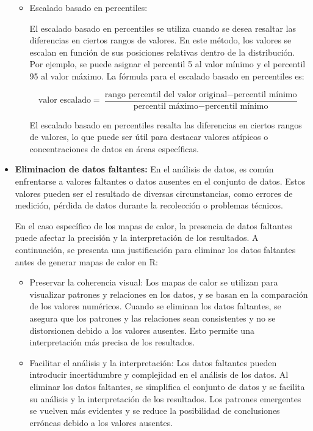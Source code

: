\documentclass{article}
\begin{document}
\begin{itemize}
\begin{itemize}
\item Escalado basado en percentiles:

El escalado basado en percentiles se utiliza cuando se desea resaltar las diferencias en ciertos rangos de valores. En este método, los valores se escalan en función de sus posiciones relativas dentro de la distribución. Por ejemplo, se puede asignar el percentil 5 al valor mínimo y el percentil 95 al valor máximo. La fórmula para el escalado basado en percentiles es:

\begin{equation}
    \textrm{valor escalado} = \frac{\textrm{rango percentil del valor original} - \textrm{percentil mínimo}}{\textrm{percentil máximo} - \textrm{percentil mínimo}}
\end{equation}

El escalado basado en percentiles resalta las diferencias en ciertos rangos de valores, lo que puede ser útil para destacar valores atípicos o concentraciones de datos en áreas específicas.
\end{itemize}


\item \textbf{Eliminacion de datos faltantes: }
En el análisis de datos, es común enfrentarse a valores faltantes o datos ausentes en el conjunto de datos. Estos valores pueden ser el resultado de diversas circunstancias, como errores de medición, pérdida de datos durante la recolección o problemas técnicos.

En el caso específico de los mapas de calor, la presencia de datos faltantes puede afectar la precisión y la interpretación de los resultados. A continuación, se presenta una justificación para eliminar los datos faltantes antes de generar mapas de calor en R:
\begin{itemize}
\item Preservar la coherencia visual: Los mapas de calor se utilizan para visualizar patrones y relaciones en los datos, y se basan en la comparación de los valores numéricos. Cuando se eliminan los datos faltantes, se asegura que los patrones y las relaciones sean consistentes y no se distorsionen debido a los valores ausentes. Esto permite una interpretación más precisa de los resultados.

\item Facilitar el análisis y la interpretación: Los datos faltantes pueden introducir incertidumbre y complejidad en el análisis de los datos. Al eliminar los datos faltantes, se simplifica el conjunto de datos y se facilita su análisis y la interpretación de los resultados. Los patrones emergentes se vuelven más evidentes y se reduce la posibilidad de conclusiones erróneas debido a los valores ausentes.


\end{itemize}
\end{itemize}
\end{document}
